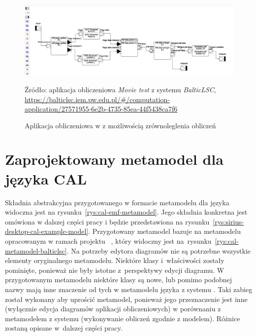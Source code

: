 \begin{figure}[!ht]
	\centering

	\includegraphics[width=0.99\linewidth]{./images/balticlsc-concurrent-application-example.png}
	\caption{Aplikacja obliczeniowa w \BalticLSC{} z możliwością
		zrównoleglenia obliczeń}\label{rys:mozliwa-do-zrownoleglenia-aplikacja-obliczeniowa}
  \medskip
  {\small Źródło: aplikacja obliczeniowa \emph{Movie test}
    z systemu \emph{BalticLSC},\\
    \url{https://balticlsc.iem.pw.edu.pl/#/computation-application/27571955-6e2b-4735-85ea-44f5438ca7f6}}
\end{figure}

\section{Zaprojektowany metamodel dla języka CAL}

Składnia abstrakcyjna przygotowanego w formacie \Ecore{} metamodelu dla języka
\CAL{} widoczna jest na
rysunku~\ref{rys:cal-emf-metamodel}. Jego składnia konkretna
jest omówiona w dalszej części pracy i będzie przedstawiona na
rysunku~\ref{rys:sirius-desktop-cal-example-model}.
Przygotowany metamodel bazuje na metamodelu
opracowanym w ramach projektu \BalticLSC{}~\cite{cal-metamodel}, który widoczny
jest na~rysunku~\ref{rys:cal-metamodel-balticlsc}.
Na potrzeby edytora diagramów nie są potrzebne wszystkie elementy oryginalnego
metamodelu. Niektóre klasy i~właściwości zostały pominięte, ponieważ nie były
istotne z~perspektywy edycji diagramu.
W przygotowanym metamodelu niektóre klasy są nowe, lub pomimo podobnej nazwy
mają inne znaczenie od tych w metamodelu języka \CAL{} z systemu \BalticLSC{}.
Taki zabieg został wykonany aby uprościć metamodel, ponieważ jego przeznaczenie
jest inne (wyłącznie edycja diagramów aplikacji obliczeniowych) w porównaniu z
metamodelem z systemu \BalticLSC{} (wykonywanie obliczeń zgodnie z modelem).
Różnice zostaną opisane w~dalszej części pracy.

